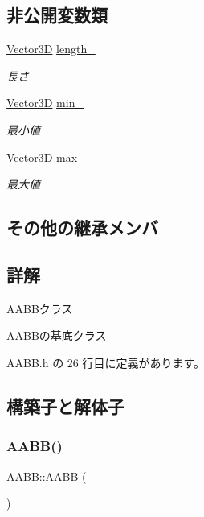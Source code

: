 \subsection*{非公開変数類}
\begin{DoxyCompactItemize}
\item 
\mbox{\hyperlink{class_vector3_d}{Vector3D}} \mbox{\hyperlink{class_a_a_b_b_abade307dbbfa9c74638fde5387d629f8}{length\+\_\+}}
\begin{DoxyCompactList}\small\item\em 長さ \end{DoxyCompactList}\item 
\mbox{\hyperlink{class_vector3_d}{Vector3D}} \mbox{\hyperlink{class_a_a_b_b_a682f7bc02fc950a24ce8a8e512e4eb52}{min\+\_\+}}
\begin{DoxyCompactList}\small\item\em 最小値 \end{DoxyCompactList}\item 
\mbox{\hyperlink{class_vector3_d}{Vector3D}} \mbox{\hyperlink{class_a_a_b_b_a7f8dca79cab056729bde7139b219fcbe}{max\+\_\+}}
\begin{DoxyCompactList}\small\item\em 最大値 \end{DoxyCompactList}\end{DoxyCompactItemize}
\subsection*{その他の継承メンバ}


\subsection{詳解}
A\+A\+B\+Bクラス 

A\+A\+B\+Bの基底クラス 

 A\+A\+B\+B.\+h の 26 行目に定義があります。



\subsection{構築子と解体子}
\mbox{\label{class_a_a_b_b_a5f5baf6c533905aa1456b3a3eb57bab2}} 
\subsubsection{\texorpdfstring{A\+A\+B\+B()}{AABB()}}
{\footnotesize\ttfamily A\+A\+B\+B\+::\+A\+A\+BB (\begin{DoxyParamCaption}{ }\end{DoxyParamCaption})\hspace{0.3cm}{\ttfamily [inline]}}



